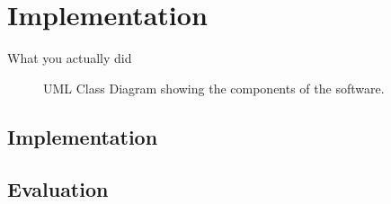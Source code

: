 \chapter{Implementation}
\label{chap:implementation}

What you actually did

\begin{figure}[ht]
    \centering
    
    \caption{UML Class Diagram showing the components of the software.}
    \label{fig:classDiagram}
\end{figure}

\section{Implementation}


\section{Evaluation}
